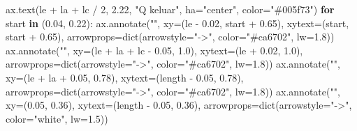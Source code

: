 \documentclass[
  12pt,
  12pt,a4paper,oneside]{report}
\newenvironment{Shaded}{}{}
\newcommand{\BuiltInTok}[1]{\textcolor[rgb]{0.00,0.50,0.00}{#1}}
\newcommand{\ControlFlowTok}[1]{\textcolor[rgb]{0.00,0.44,0.13}{\textbf{#1}}}
\newcommand{\DecValTok}[1]{\textcolor[rgb]{0.25,0.63,0.44}{#1}}
\newcommand{\FloatTok}[1]{\textcolor[rgb]{0.25,0.63,0.44}{#1}}
\newcommand{\KeywordTok}[1]{\textcolor[rgb]{0.00,0.44,0.13}{\textbf{#1}}}
\newcommand{\NormalTok}[1]{#1}
\newcommand{\OperatorTok}[1]{\textcolor[rgb]{0.40,0.40,0.40}{#1}}
\newcommand{\StringTok}[1]{\textcolor[rgb]{0.25,0.44,0.63}{#1}}
\begin{document}
\begin{Shaded}
\begin{Highlighting}[]
\NormalTok{    ax.text(le }\OperatorTok{+}\NormalTok{ la }\OperatorTok{+}\NormalTok{ lc }\OperatorTok{/} \DecValTok{2}\NormalTok{, }\FloatTok{2.22}\NormalTok{, }\StringTok{"Q keluar"}\NormalTok{, ha}\OperatorTok{=}\StringTok{"center"}\NormalTok{, color}\OperatorTok{=}\StringTok{"\#005f73"}\NormalTok{)}
    \ControlFlowTok{for}\NormalTok{ start }\KeywordTok{in}\NormalTok{ (}\FloatTok{0.04}\NormalTok{, }\FloatTok{0.22}\NormalTok{):}
\NormalTok{        ax.annotate(}\StringTok{""}\NormalTok{, xy}\OperatorTok{=}\NormalTok{(le }\OperatorTok{{-}} \FloatTok{0.02}\NormalTok{, start }\OperatorTok{+} \FloatTok{0.65}\NormalTok{), xytext}\OperatorTok{=}\NormalTok{(start, start }\OperatorTok{+} \FloatTok{0.65}\NormalTok{),}
\NormalTok{                    arrowprops}\OperatorTok{=}\BuiltInTok{dict}\NormalTok{(arrowstyle}\OperatorTok{=}\StringTok{"{-}\textgreater{}"}\NormalTok{, color}\OperatorTok{=}\StringTok{"\#ca6702"}\NormalTok{, lw}\OperatorTok{=}\FloatTok{1.8}\NormalTok{))}
\NormalTok{    ax.annotate(}\StringTok{""}\NormalTok{, xy}\OperatorTok{=}\NormalTok{(le }\OperatorTok{+}\NormalTok{ la }\OperatorTok{+}\NormalTok{ lc }\OperatorTok{{-}} \FloatTok{0.05}\NormalTok{, }\FloatTok{1.0}\NormalTok{), xytext}\OperatorTok{=}\NormalTok{(le }\OperatorTok{+} \FloatTok{0.02}\NormalTok{, }\FloatTok{1.0}\NormalTok{),}
\NormalTok{                arrowprops}\OperatorTok{=}\BuiltInTok{dict}\NormalTok{(arrowstyle}\OperatorTok{=}\StringTok{"{-}\textgreater{}"}\NormalTok{, color}\OperatorTok{=}\StringTok{"\#ca6702"}\NormalTok{, lw}\OperatorTok{=}\FloatTok{1.8}\NormalTok{))}
\NormalTok{    ax.annotate(}\StringTok{""}\NormalTok{, xy}\OperatorTok{=}\NormalTok{(le }\OperatorTok{+}\NormalTok{ la }\OperatorTok{+} \FloatTok{0.05}\NormalTok{, }\FloatTok{0.78}\NormalTok{), xytext}\OperatorTok{=}\NormalTok{(length }\OperatorTok{{-}} \FloatTok{0.05}\NormalTok{, }\FloatTok{0.78}\NormalTok{),}
\NormalTok{                arrowprops}\OperatorTok{=}\BuiltInTok{dict}\NormalTok{(arrowstyle}\OperatorTok{=}\StringTok{"{-}\textgreater{}"}\NormalTok{, color}\OperatorTok{=}\StringTok{"\#ca6702"}\NormalTok{, lw}\OperatorTok{=}\FloatTok{1.8}\NormalTok{))}
\NormalTok{    ax.annotate(}\StringTok{""}\NormalTok{, xy}\OperatorTok{=}\NormalTok{(}\FloatTok{0.05}\NormalTok{, }\FloatTok{0.36}\NormalTok{), xytext}\OperatorTok{=}\NormalTok{(length }\OperatorTok{{-}} \FloatTok{0.05}\NormalTok{, }\FloatTok{0.36}\NormalTok{),}
\NormalTok{                arrowprops}\OperatorTok{=}\BuiltInTok{dict}\NormalTok{(arrowstyle}\OperatorTok{=}\StringTok{"{-}\textgreater{}"}\NormalTok{, color}\OperatorTok{=}\StringTok{"white"}\NormalTok{, lw}\OperatorTok{=}\FloatTok{1.5}\NormalTok{))}

\end{Highlighting}
\end{Shaded}
\end{document}

